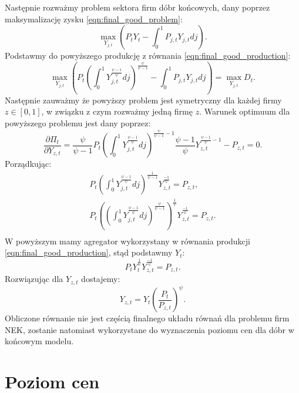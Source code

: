 Następnie rozważmy problem sektora firm dóbr końcowych, dany poprzez maksymalizację zysku \eqref{eqn:final_good_problem}:
\begin{equation}
    \max_{Y_{j,t}} \left(P_t Y_t - \int_0^1P_{j,t}Y_{j,t} dj\right).
\end{equation}
Podstawmy do powyższego produkcję z równania \eqref{eqn:final_good_production}:
\begin{equation}
    \max_{Y_{j,t}} \left(P_t \left(\int_0^1 Y_{j,t}^{\frac{\psi-1}{\psi}}dj\right)^{\frac{\psi}{\psi-1}} - \int_0^1P_{j,t}Y_{j,t} dj \right)= \max_{Y_{j,t}} D_t.
\end{equation}
Następnie zauważmy że powyższy problem jest symetryczny dla każdej firmy $z \in [0,1]$, w związku z czym rozważmy jedną firmę $z$. Warunek optimuum dla powyższego problemu jest dany poprzez:
\begin{equation}
    \frac{\partial \Pi_t}{\partial Y_{z,t}} = \frac{\psi}{\psi-1} P_t \left(\int_0^1 Y_{j,t}^{\frac{\psi-1}{\psi}}dj\right)^{\frac{\psi}{\psi-1} - 1} \frac{\psi-1}{\psi} Y_{z,t}^{\frac{\psi-1}{\psi} - 1}- P_{z,t} = 0.
\end{equation}
Porządkując:
\begin{gather}
    P_t \left(\int_0^1 Y_{j,t}^{\frac{\psi-1}{\psi}}dj\right)^{\frac{1}{\psi-1}} Y_{z,t}^{\frac{-1}{\psi}} = P_{z,t}, \\
    P_t \left(\left(\int_0^1 Y_{j,t}^{\frac{\psi-1}{\psi}}dj\right)^{\frac{\psi}{\psi-1}}\right)^{\frac{1}{\psi}} Y_{z,t}^{\frac{-1}{\psi}} = P_{z,t}. \\
\end{gather}
W powyższym mamy agregator wykorzystany w równania produkcji \eqref{eqn:final_good_production}, stąd podstawmy $Y_t$:
\begin{equation}
    P_t Y_t^{\frac{1}{\psi}} Y_{z,t}^{\frac{-1}{\psi}} = P_{z,t}.
\end{equation}
Rozwiązując dla $Y_{z,t}$ dostajemy:
\begin{equation}
    \label{eqn:solution-final-good}
    Y_{z,t} = Y_t \left(\frac{P_t}{P_{z,t}}\right)^\psi.
\end{equation}
Obliczone równanie nie jest częścią finalnego układu równań dla problemu firm NEK, zostanie natomiast wykorzystane do wyznaczenia poziomu cen dla dóbr w końcowym modelu.


\section{Poziom cen}
\label{sec:price_level}

